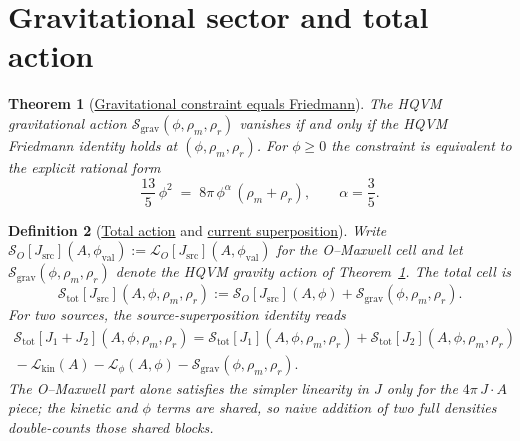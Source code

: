 \documentclass[11pt]{amsart}
\newtheorem{theorem}{Theorem}[section]
\newtheorem{definition}[theorem]{Definition}
\begin{document}
\section{Gravitational sector and total action}
\label{sec:grav}

\begin{theorem}[\texorpdfstring{\hyperref[lean:S-grav]{Gravitational constraint equals Friedmann}}{Gravitational constraint equals Friedmann}]
\label{thm:friedmann}
The HQVM gravitational action \(\mathcal{S}_{\mathrm{grav}}(\phi,\rho_m,\rho_r)\) vanishes if and only if the HQVM Friedmann identity holds at \((\phi,\rho_m,\rho_r)\). For \(\phi\ge 0\) the constraint is equivalent to the explicit rational form
\[
\frac{13}{5}\,\phi^2 \;=\; 8\pi\,\phi^{\alpha}\,(\rho_m+\rho_r),
\qquad \alpha=\frac35.
\]
\end{theorem}

\begin{definition}[\texorpdfstring{\hyperref[lean:total-action]{Total action} and \hyperref[lean:add-J]{current superposition}}{Total action and current superposition}]
\label{def:total}
Write \(\mathcal{S}_O[J_{\mathrm{src}}](A,\phi_{\mathrm{val}}):=\mathcal{L}_O[J_{\mathrm{src}}](A,\phi_{\mathrm{val}})\) for the O--Maxwell cell and let \(\mathcal{S}_{\mathrm{grav}}(\phi,\rho_m,\rho_r)\) denote the HQVM gravity action of Theorem~\ref{thm:friedmann}. The total cell is
\[
\mathcal{S}_{\mathrm{tot}}[J_{\mathrm{src}}](A,\phi,\rho_m,\rho_r)
:= \mathcal{S}_O[J_{\mathrm{src}}](A,\phi) + \mathcal{S}_{\mathrm{grav}}(\phi,\rho_m,\rho_r) .
\]
For two sources, the source-superposition identity reads
\begin{multline}
\label{eq:superposition-correction}
\mathcal{S}_{\mathrm{tot}}[J_1+J_2](A,\phi,\rho_m,\rho_r)
= \mathcal{S}_{\mathrm{tot}}[J_1](A,\phi,\rho_m,\rho_r)
+ \mathcal{S}_{\mathrm{tot}}[J_2](A,\phi,\rho_m,\rho_r) \\
{}- \mathcal{L}_{\mathrm{kin}}(A) - \mathcal{L}_\phi(A,\phi) - \mathcal{S}_{\mathrm{grav}}(\phi,\rho_m,\rho_r).
\end{multline}
The O--Maxwell part alone satisfies the simpler linearity in \(J\) only for the \(4\pi\,J\!\cdot\!A\) piece; the kinetic and \(\phi\) terms are shared, so naive addition of two full densities double-counts those shared blocks.
\end{definition}
\end{document}
